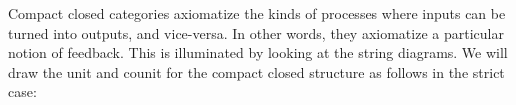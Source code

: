 Compact closed categories axiomatize the kinds of processes where inputs can be turned into outputs, and vice-versa.  In other words, they axiomatize a particular notion of feedback.  This is illuminated by looking at the string diagrams.
We will draw the unit and counit for the compact closed structure as follows in the strict case:
%
%

